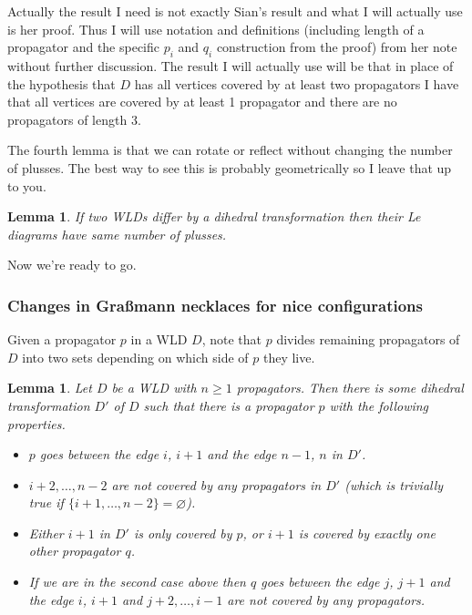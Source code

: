 \documentclass[11pt]{article}
\newtheorem{lem}[thm]{Lemma}
\theoremstyle{remark}
\theoremstyle{definition}
\begin{document}
Actually the result I need is not exactly Sian's result and what I will actually use is her proof.  Thus I will use notation and definitions (including length of a propagator and the specific $p_i$ and $q_i$ construction from the proof) from her note without further discussion.  The result I will actually use will be that in place of the hypothesis that $D$ has all vertices covered by at least two propagators I have that all vertices are covered by at least 1 propagator and there are no propagators of length 3.

The fourth lemma is that we can rotate or reflect without changing the number of plusses.  The best way to see this is probably geometrically so I leave that up to you.

\begin{lem}\label{lem dihedral}
  If two WLDs differ by a dihedral transformation then their Le diagrams have same number of plusses.
\end{lem}

Now we're ready to go.

\subsubsection{Changes in Gra\ss mann necklaces for nice configurations}

Given a propagator $p$ in a WLD $D$, note that $p$ divides remaining propagators of $D$ into two sets depending on which side of $p$ they live.

\begin{lem}\label{lem good p}
  Let $D$ be a WLD with $n\geq 1$ propagators.  Then there is some dihedral transformation $D'$ of $D$ such that there is a propagator $p$ with the following properties.
  \begin{itemize}
  \item $p$ goes between the edge $i$, $i+1$ and the edge $n-1$, $n$ in $D'$.
  \item $i+2, \ldots, n-2$ are not covered by any propagators in $D'$ (which is trivially true if $\{i+1, \ldots, n-2\}=\varnothing$).
  \item Either $i+1$ in $D'$ is only covered by $p$, or $i+1$ is covered by exactly one other propagator $q$.
  \item If we are in the second case above then $q$ goes between the edge $j$, $j+1$ and the edge $i$, $i+1$ and $j+2, \ldots, i-1$ are not covered by any propagators.
  \end{itemize}
\end{lem}
\end{document}

